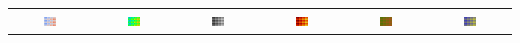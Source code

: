 \documentclass{llncs}
\begin{document}
\begin{plate*}
\begin{tabular}{c@{\,}c@{\,}c@{\,}c@{\,}c@{\,}c}
    \includegraphics[width=0.16\textwidth]{images/Cool2WarmLfSensitivity} &
    \includegraphics[width=0.16\textwidth]{images/RainbowLfSensitivity} &
    \includegraphics[width=0.16\textwidth]{images/GrayscaleLfSensitivity} &
    \includegraphics[width=0.16\textwidth]{images/BlackBodyLfSensitivity} &
    \includegraphics[width=0.16\textwidth]{images/Green2RedLfSensitivity} &
    \includegraphics[width=0.16\textwidth]{images/Blue2YellowLfSensitivity} \\


\end{tabular}
\end{plate*}
\end{document}
